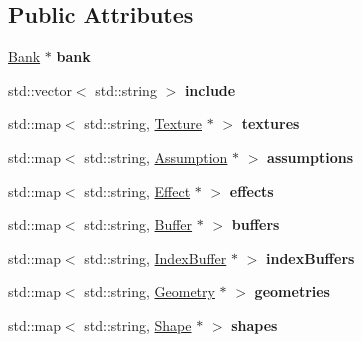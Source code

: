 \subsection*{Public Attributes}
\begin{DoxyCompactItemize}
\item 
\hypertarget{classg2c_1_1_model_aede46e88355f5b55c4088e0bf01e8744}{
\hyperlink{classg2c_1_1_bank}{Bank} $\ast$ {\bfseries bank}}
\label{classg2c_1_1_model_aede46e88355f5b55c4088e0bf01e8744}

\item 
\hypertarget{classg2c_1_1_model_a9228ed89466cb94aea226300ccc2f19c}{
std::vector$<$ std::string $>$ {\bfseries include}}
\label{classg2c_1_1_model_a9228ed89466cb94aea226300ccc2f19c}

\item 
\hypertarget{classg2c_1_1_model_a149b71f7012c169a11a5c451ab29c8d9}{
std::map$<$ std::string, \hyperlink{classg2c_1_1_texture}{Texture} $\ast$ $>$ {\bfseries textures}}
\label{classg2c_1_1_model_a149b71f7012c169a11a5c451ab29c8d9}

\item 
\hypertarget{classg2c_1_1_model_a35248d5aae947c5ee4d728b6dfb077b2}{
std::map$<$ std::string, \hyperlink{classg2c_1_1_assumption}{Assumption} $\ast$ $>$ {\bfseries assumptions}}
\label{classg2c_1_1_model_a35248d5aae947c5ee4d728b6dfb077b2}

\item 
\hypertarget{classg2c_1_1_model_ab845bca67dea602b512d6a82b6c4bca0}{
std::map$<$ std::string, \hyperlink{classg2c_1_1_effect}{Effect} $\ast$ $>$ {\bfseries effects}}
\label{classg2c_1_1_model_ab845bca67dea602b512d6a82b6c4bca0}

\item 
\hypertarget{classg2c_1_1_model_a8c4c0aae735564dc4d2c6c73ead144a8}{
std::map$<$ std::string, \hyperlink{classg2c_1_1_buffer}{Buffer} $\ast$ $>$ {\bfseries buffers}}
\label{classg2c_1_1_model_a8c4c0aae735564dc4d2c6c73ead144a8}

\item 
\hypertarget{classg2c_1_1_model_a1d2402bab3cd380753e71f44a3a6e564}{
std::map$<$ std::string, \hyperlink{classg2c_1_1_index_buffer}{IndexBuffer} $\ast$ $>$ {\bfseries indexBuffers}}
\label{classg2c_1_1_model_a1d2402bab3cd380753e71f44a3a6e564}

\item 
\hypertarget{classg2c_1_1_model_a76e1514935ee35ff6ea820fa7b0410b3}{
std::map$<$ std::string, \hyperlink{classg2c_1_1_geometry}{Geometry} $\ast$ $>$ {\bfseries geometries}}
\label{classg2c_1_1_model_a76e1514935ee35ff6ea820fa7b0410b3}

\item 
\hypertarget{classg2c_1_1_model_afcb536300e2316f23d960e8301e09199}{
std::map$<$ std::string, \hyperlink{classg2c_1_1_shape}{Shape} $\ast$ $>$ {\bfseries shapes}}
\label{classg2c_1_1_model_afcb536300e2316f23d960e8301e09199}

\end{DoxyCompactItemize}
